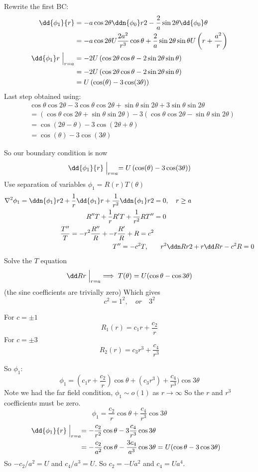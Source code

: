 \documentclass{/home/janmebows/Documents/LatexTemplates/myassignment}
\begin{document}
Rewrite the first BC:
\begin{align*}
    \dd{\phi_1}{r} &= - a\cos2\theta \ddn{\phi_0}r2 - \frac2a \sin2\theta \dd{\phi_0}\theta\\
    &= -a\cos2\theta  U\frac{2a^2}{r^3}\cos\theta + \frac2a \sin2\theta \sin\theta U\left(r + \frac{a^2}{r}\right)\\
    \dd{\phi_1}r \Bigm|_{r=a} &= -2U \left(\cos2\theta \cos\theta - 2\sin2\theta \sin\theta\right)\\
    &= -2U \left(\cos2\theta \cos\theta - 2\sin2\theta \sin\theta\right)\\
    &= U \left(\cos(\theta) - 3\cos(3\theta)\right)
\end{align*}
Last step obtained using:
\begin{align*}
    &\cos\theta \cos2\theta - 3\cos\theta \cos2\theta + \sin\theta \sin 2\theta +3\sin\theta \sin 2\theta\\
    &=\left(\cos\theta \cos2\theta + \sin\theta\sin2\theta \right) -3 \left(\cos\theta \cos2\theta - \sin\theta\sin2\theta\right)\\
    &= \cos(2\theta -\theta) -3 \cos(2\theta + \theta)\\
    &= \cos(\theta) - 3\cos(3\theta)
\end{align*}

So our boundary condition is now
\[\dd{\phi_1}{r}\Bigm|_{r=a} = U \left(\cos(\theta) - 3\cos(3\theta)\right)\]
Use separation of variables $\phi_1 = R(r) T(\theta)$
\begin{align*}
    \nabla^2 \phi_1 = \ddn{\phi_1}r2 + \frac1r \dd{\phi_1}r + \frac1{r^2} \ddn{\phi_1}r2 &=0, \quad r\geq a\\
    R'' T + \frac1r R'T + \frac1{r^2} RT'' &= 0\\
    \frac{T''}{T} = -r^2 \frac{R''}{R} + -r \frac{R'}{R} + R = c^2\\
    T'' = -c^2 T ,\quad & \quad r^2 \ddn Rr2 + r\dd Rr - c^2 R = 0
\end{align*}
Solve the $T$ equation
\[\dd Rr\Bigm|_{r=a} \implies T(\theta) = U(\cos\theta - \cos 3\theta)\]
(the sine coefficients are trivially zero)
Which gives
\[c^2 = 1^2 , \quad or \quad 3^2\]

For $c=\pm 1$
\[R_1(r) = c_1 r + \frac{c_2}r\]
For $c=\pm3$
\[R_2(r) = c_3 r^3 + \frac{c_4}{r^3}\]

So $\phi_1$:
\[\phi_1 = (c_1 r + \frac{c_2}r) \cos\theta + (c_3 r^3) + \frac{c_4}{r^3}) \cos3\theta\]
Note we had the far field condition, $\phi_1 \sim o(1)$ as $r\to \infty$ So the $r$ and $r^3$ coefficients must be zero.
\[\phi_1 = \frac{c_2}{r} \cos\theta + \frac{c_4}{r^3} \cos3\theta\]
\begin{align*}
    \dd{\phi_1}{r} \Bigm|_{r=a} = -\frac{c_2}{r^2}\cos\theta - 3\frac{c_4}{r^3}\cos3\theta\\
    = -\frac{c_2}{a^2} \cos\theta - \frac{3c_4}{a^3} \cos3\theta &=U(\cos\theta - 3\cos3\theta)
\end{align*}
So $-c_2/a^2 = U$ and $c_4/a^3 = U$. So $c_2 = -Ua^2$ and $c_4 = Ua^4$.
\end{document}
